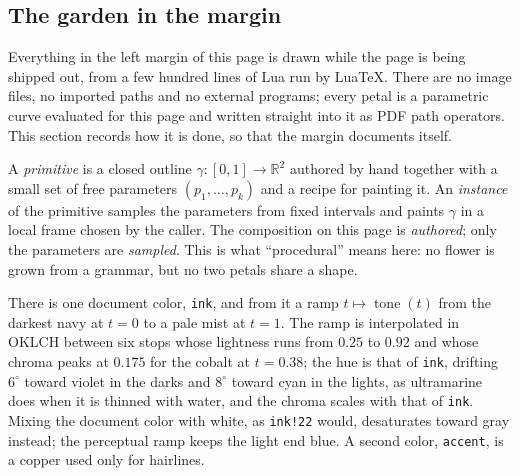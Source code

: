 \setcounter{section}{3}\setcounter{subsection}{1}
\subsection{The garden in the margin}

Everything in the left margin of this page is drawn while the page is being shipped out,
from a few hundred lines of Lua run by Lua\TeX. There are no image files, no imported
paths and no external programs; every petal is a parametric curve evaluated for this page
and written straight into it as PDF path operators. This section records how it is done,
so that the margin documents itself.

\begin{definition}
A \emph{primitive} is a closed outline $\gamma\colon[0,1]\to\mathbb{R}^2$ authored by hand
together with a small set of free parameters $(p_1,\dots,p_k)$ and a recipe for painting
it. An \emph{instance} of the primitive samples the parameters from fixed intervals and
paints $\gamma$ in a local frame chosen by the caller. The composition on this page is
\emph{authored}; only the parameters are \emph{sampled}. This is what ``procedural'' means
here: no flower is grown from a grammar, but no two petals share a shape.
\end{definition}

\begin{construction}[Palette]
There is one document color, \texttt{ink}, and from it a ramp $t\mapsto\operatorname{tone}(t)$
from the darkest navy at $t=0$ to a pale mist at $t=1$. The ramp is interpolated in
OKLCH between six stops whose lightness runs from $0.25$ to $0.92$ and whose chroma peaks
at $0.175$ for the cobalt at $t=0.38$; the hue is that of \texttt{ink}, drifting $6^\circ$
toward violet in the darks and $8^\circ$ toward cyan in the lights, as ultramarine does when
it is thinned with water, and the chroma scales with that of \texttt{ink}. Mixing the
document color with white, as \texttt{ink!22} would, desaturates toward gray instead;
the perceptual ramp keeps the light end blue. A second color, \texttt{accent}, is a copper
used only for hairlines.
\end{construction}

